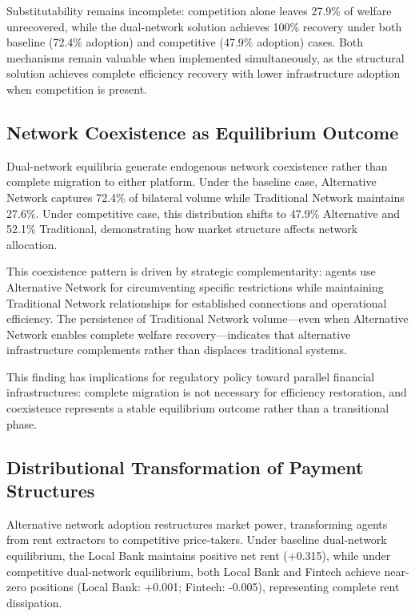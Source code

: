 Substitutability remains incomplete: competition alone leaves 27.9\% of welfare unrecovered, while the dual-network solution achieves 100\% recovery under both baseline (72.4\% adoption) and competitive (47.9\% adoption) cases. Both mechanisms remain valuable when implemented simultaneously, as the structural solution achieves complete efficiency recovery with lower infrastructure adoption when competition is present.

\subsection{Network Coexistence as Equilibrium Outcome}

Dual-network equilibria generate endogenous network coexistence rather than complete migration to either platform. Under the baseline case, Alternative Network captures 72.4\% of bilateral volume while Traditional Network maintains 27.6\%. Under competitive case, this distribution shifts to 47.9\% Alternative and 52.1\% Traditional, demonstrating how market structure affects network allocation.

This coexistence pattern is driven by strategic complementarity: agents use Alternative Network for circumventing specific restrictions while maintaining Traditional Network relationships for established connections and operational efficiency. The persistence of Traditional Network volume—even when Alternative Network enables complete welfare recovery—indicates that alternative infrastructure complements rather than displaces traditional systems.

This finding has implications for regulatory policy toward parallel financial infrastructures: complete migration is not necessary for efficiency restoration, and coexistence represents a stable equilibrium outcome rather than a transitional phase.

\subsection{Distributional Transformation of Payment Structures}

Alternative network adoption restructures market power, transforming agents from rent extractors to competitive price-takers. Under baseline dual-network equilibrium, the Local Bank maintains positive net rent (+0.315), while under competitive dual-network equilibrium, both Local Bank and Fintech achieve near-zero positions (Local Bank: +0.001; Fintech: -0.005), representing complete rent dissipation.

